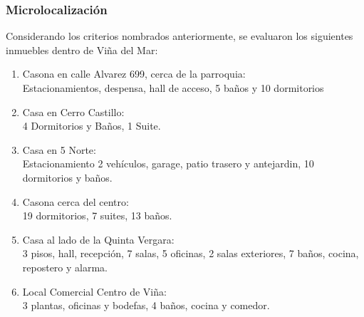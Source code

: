 \subsubsection{Microlocalización}
Considerando los criterios nombrados anteriormente, se evaluaron los siguientes inmuebles dentro de Viña del Mar:
\begin{enumerate}
    \item Casona en calle Alvarez 699, cerca de la parroquia:\\  Estacionamientos, despensa, hall de acceso, 5 baños y 10 dormitorios
    \item Casa en Cerro Castillo:\\
    4 Dormitorios y Baños, 1 Suite.
    \item Casa en 5 Norte:\\ Estacionamiento 2 vehículos, garage, patio trasero
    y antejardin,  10 dormitorios y baños.
    \item Casona cerca del centro:\\
    19 dormitorios, 7 suites, 13 baños.
    \item Casa al lado de la Quinta Vergara:\\
    3 pisos, hall, recepción, 7 salas, 5 oficinas, 2 salas exteriores, 7 baños,
    cocina, repostero y alarma.
    \item Local Comercial Centro de Viña:     \\
    3 plantas, oficinas y bodefas, 4 baños, cocina y comedor. 
\end{enumerate}

